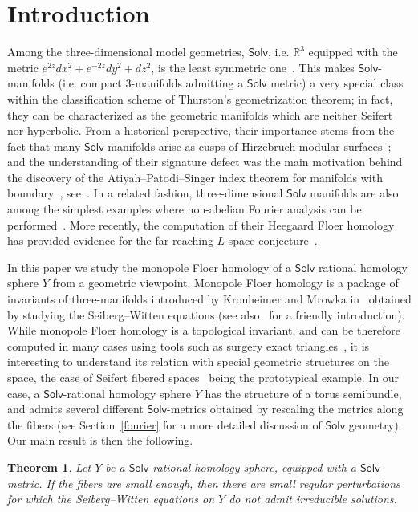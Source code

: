 \documentclass[11pt]{article}
\newtheorem{theo}{Theorem}[section]
\theoremstyle{definition}
\numberwithin{equation}{section}
\numberwithin{figure}{section}
\numberwithin{table}{section}
\newcommand{\Solv}{\mathsf{Solv}}
\begin{document}
\section{Introduction}
Among the three-dimensional model geometries, $\Solv$, i.e. $\mathbb{R}^3$ equipped with the metric $e^{2z}dx^2+e^{-2z}dy^2+dz^2$, is the least symmetric one~\cite{Sco}. This makes $\Solv$-manifolds (i.e. compact $3$-manifolds admitting a $\Solv$ metric) a very special class within the classification scheme of Thurston's geometrization theorem; in fact, they can be characterized as the geometric manifolds which are neither Seifert nor hyperbolic. From a historical perspective, their importance stems from the fact that many $\Solv$ manifolds arise as cusps of Hirzebruch modular surfaces~\cite{Hir}; and the understanding of their signature defect was the main motivation behind the discovery of the Atiyah--Patodi--Singer index theorem for manifolds with boundary~\cite{APS}, see~\cite{ADS}. In a related fashion, three-dimensional $\Solv$ manifolds are also among the simplest examples where non-abelian Fourier analysis can be performed~\cite{Bre}. More recently, the computation of their Heegaard Floer homology has provided evidence for the far-reaching $L$-space conjecture~\cite{BCW}.


In this paper we study the monopole Floer homology of a $\Solv$ rational homology sphere $Y$ from a geometric viewpoint. Monopole Floer homology is a package of invariants of three-manifolds introduced by Kronheimer and Mrowka in~\cite{KM} obtained by studying the Seiberg--Witten equations (see also~\cite{Lin3} for a friendly introduction). While monopole Floer homology is a topological invariant, and can be therefore computed in many cases using tools such as surgery exact triangles~\cite{KMOS}, it is interesting to understand its relation with special geometric structures on the space, the case of Seifert fibered spaces~\cite{MOY} being the prototypical example. In our case, a $\Solv$-rational homology sphere $Y$ has the structure of a torus semibundle, and admits several different $\Solv$-metrics obtained by rescaling the metrics along the fibers (see Section~\ref{fourier} for a more detailed discussion of $\Solv$ geometry). Our main result is then the following.
\begin{theo}\label{main}
Let $Y$ be a $\Solv$-rational homology sphere, equipped with a $\Solv$ metric. If the fibers are small enough, then there are small regular perturbations for which the Seiberg--Witten equations on $Y$ do not admit irreducible solutions.
\end{theo}
\end{document}
